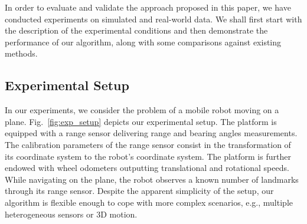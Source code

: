 In order to evaluate and validate the approach proposed in this paper, we have
conducted experiments on simulated and real-world data. We shall first start
with the description of the experimental conditions and then demonstrate the
performance of our algorithm, along with some comparisons against existing
methods.

\subsection{Experimental Setup}

In our experiments, we consider the problem of a mobile robot moving on a plane.
Fig.~\ref{fig:exp_setup} depicts our experimental setup. The platform is
equipped with a range sensor delivering range and bearing angles measurements.
The calibration parameters of the range sensor consist in the transformation of
its coordinate system to the robot's coordinate system. The platform is further
endowed with wheel odometers outputting translational and rotational speeds.
While navigating on the plane, the robot observes a known number of landmarks
through its range sensor. Despite the apparent simplicity of the setup, our
algorithm is flexible enough to cope with more complex scenarios, e.g., multiple
heterogeneous sensors or 3D motion.

